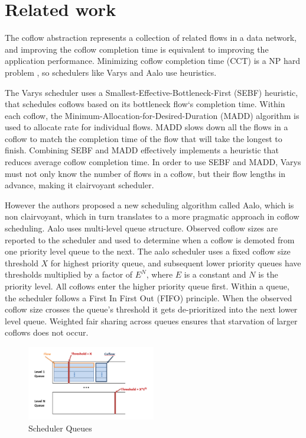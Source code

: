 \documentclass[conference]{IEEEtran}
\begin{document}
\section{Related work}

The coflow abstraction represents a collection of related flows in a data network, and improving the coflow completion time is equivalent to improving the application performance. Minimizing coflow completion time (CCT) is a NP hard problem \cite{varys}, so schedulers like Varys \cite{varys} and Aalo \cite{aalo} use heuristics.

The Varys\cite{varys} scheduler uses a Smallest-Effective-Bottleneck-First (SEBF) heuristic, that schedules coflows based on its bottleneck flow`s completion time. Within each coflow, the Minimum-Allocation-for-Desired-Duration (MADD) algorithm is used to allocate rate for individual flows. MADD slows down all the flows in a coflow to match the completion time of the flow that will take the longest to finish. Combining SEBF and MADD effectively implements a heuristic that reduces average coflow completion time. In order to use SEBF and MADD, Varys must not only know the number of flows in a coflow, but their flow lengths in advance, making it clairvoyant scheduler.

However the authors proposed a new scheduling algorithm called Aalo\cite{aalo}, which is non clairvoyant, which in turn translates to a more pragmatic approach in coflow scheduling. Aalo uses multi-level queue structure. Observed coflow sizes are reported to the scheduler and used to determine when a coflow is demoted from one priority level queue to the next. The aalo scheduler uses a fixed coflow size threshold \(X\) for highest priority queue, and subsequent lower priority queues have thresholds multiplied by a factor of \(E^N\), where \(E\) is a constant and \(N\) is the priority level. All coflows enter the higher priority queue first. Within a queue, the scheduler follows a First In First Out (FIFO) principle. When the observed coflow size crosses the queue's threshold it gets de-prioritized into the next lower level queue. Weighted fair sharing across queues ensures that starvation of larger coflows does not occur.

\begin{figure}
\includegraphics[width=0.5\textwidth]{queues.png}\caption{Scheduler Queues}
\end{figure}
\end{document}

